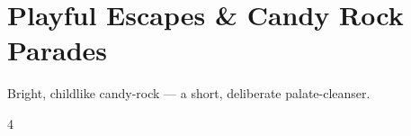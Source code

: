 \documentclass[a4paper,landscape]{memoir}
\begin{document}
\chapter{Playful Escapes \& Candy Rock Parades}
Bright, childlike candy-rock — a short, deliberate palate-cleanser.
\clearpage\begin{multicols*}{4}
\end{multicols*}

\appendix

\backmatter
\printindex[songs]
\clearpage
\printindex[tags]
\end{document}
